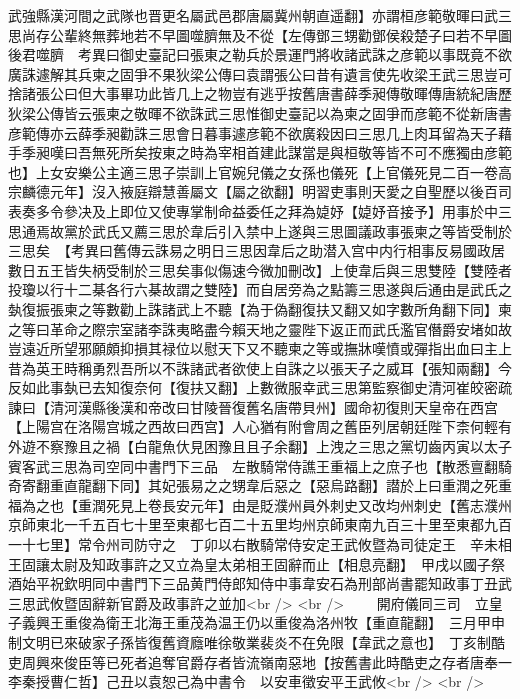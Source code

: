 武強縣漢河間之武隊也晋更名屬武邑郡唐屬冀州朝直遥翻】亦謂桓彦範敬暉曰武三思尚存公輩終無葬地若不早圖噬臍無及不從【左傳鄧三甥勸鄧侯殺楚子曰若不早圖後君噬臍　考異曰御史臺記曰張東之勒兵於景運門將收諸武誅之彦範以事既竟不欲廣誅遽解其兵柬之固爭不果狄梁公傳曰袁謂張公曰昔有遺言使先收梁王武三思豈可捨諸張公曰但大事畢功此皆几上之物豈有逃乎按舊唐書薛季昶傳敬暉傳唐統紀唐歷狄梁公傳皆云張柬之敬暉不欲誅武三思惟御史臺記以為柬之固爭而彦範不從新唐書彦範傳亦云薛季昶勸誅三思會日暮事遽彦範不欲廣殺因曰三思几上肉耳留為天子藉手季昶嘆曰吾無死所矣按東之時為宰相首建此謀當是與桓敬等皆不可不應獨由彦範也】上女安樂公主適三思子崇訓上官婉兒儀之女孫也儀死【上官儀死見二百一卷高宗麟德元年】沒入掖庭辯慧善屬文【屬之欲翻】明習吏事則天愛之自聖歷以後百司表奏多令參决及上即位又使專掌制命益委任之拜為媫妤【媫妤音接予】用事於中三思通焉故黨於武氏又薦三思於韋后引入禁中上遂與三思圖議政事張柬之等皆受制於三思矣　【考異曰舊傳云誅易之明日三思因韋后之助潜入宫中内行相事反易國政居數日五王皆失柄受制於三思矣事似傷速今微加刪改】上使韋后與三思雙陸【雙陸者投瓊以行十二棊各行六棊故謂之雙陸】而自居旁為之點籌三思遂與后通由是武氏之埶復振張柬之等數勸上誅諸武上不聽【為于偽翻復扶又翻又如字數所角翻下同】柬之等曰革命之際宗室諸李誅夷略盡今賴天地之靈陛下返正而武氏濫官僭爵安堵如故豈遠近所望邪願頗抑損其禄位以慰天下又不聽柬之等或撫牀嘆憤或彈指出血曰主上昔為英王時稱勇烈吾所以不誅諸武者欲使上自誅之以張天子之威耳【張知兩翻】今反如此事埶已去知復奈何【復扶又翻】上數微服幸武三思第監察御史清河崔皎密疏諫曰【清河漢縣後漢和帝改曰甘陵晉復舊名唐帶貝州】國命初復則天皇帝在西宫【上陽宫在洛陽宫城之西故曰西宫】人心猶有附會周之舊臣列居朝廷陛下柰何輕有外遊不察豫且之禍【白龍魚㐲見困豫且且子余翻】上洩之三思之黨切齒丙寅以太子賓客武三思為司空同中書門下三品　左散騎常侍譙王重福上之庶子也【散悉亶翻騎奇寄翻重直龍翻下同】其妃張易之之甥韋后惡之【惡烏路翻】譛於上曰重潤之死重福為之也【重潤死見上卷長安元年】由是貶濮州員外刺史又改均州刺史【舊志濮州京師東北一千五百七十里至東都七百二十五里均州京師東南九百三十里至東都九百一十七里】常令州司防守之　丁卯以右散騎常侍安定王武攸暨為司徒定王　辛未相王固讓太尉及知政事許之又立為皇太弟相王固辭而止【相息亮翻】　甲戌以國子祭酒始平祝欽明同中書門下三品黄門侍郎知侍中事韋安石為刑部尚書罷知政事丁丑武三思武攸暨固辭新官爵及政事許之並加<br />
<br />
　　開府儀同三司　立皇子義興王重俊為衛王北海王重茂為温王仍以重俊為洛州牧【重直龍翻】　三月甲申制文明已來破家子孫皆復舊資廕唯徐敬業裴炎不在免限【韋武之意也】　丁亥制酷吏周興來俊臣等已死者追奪官爵存者皆流嶺南惡地【按舊書此時酷吏之存者唐奉一李秦授曹仁哲】己丑以袁恕己為中書令　以安車徵安平王武攸<br />
<br />
